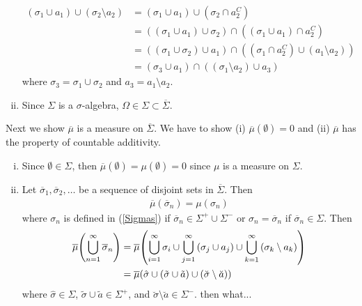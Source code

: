 \documentclass[12pt]{article}
\theoremstyle{plain}
\begin{document}
\begin{enumerate}[(i)]
        \begin{align*}
            (\sigma_1 \cup a_1) \cup (\sigma_2 \setminus a_2) &= (\sigma_1 \cup a_1) \cup (\sigma_2 \cap a_2^C) \\
            &= ((\sigma_1 \cup a_1) \cup \sigma_2) \cap ((\sigma_1 \cup a_1) \cap a_2^C) \\
            &= ((\sigma_1 \cup \sigma_2) \cup a_1) \cap ((\sigma_1 \cap a_2^C) \cup (a_1 \setminus a_2)) \\
            &= (\sigma_3 \cup a_1) \cap ((\sigma_1 \setminus a_2) \cup a_3)
        \end{align*}
        where $\sigma_3 = \sigma_1 \cup \sigma_2$ and $a_3 = a_1 \setminus a_2$.
    \item
        Since $\Sigma$ is a $\sigma$-algebra, $\Omega \in \Sigma \subset \overline{\Sigma}$.
\end{enumerate}
Next we show $\overline{\mu}$ is a measure on $\overline{\Sigma}$.  We have to show (i) $\overline{\mu}(\emptyset) = 0$ and (ii) $\overline{\mu}$ has the property of countable additivity.
\begin{enumerate}[(i)]
    \item
        Since $\emptyset \in \Sigma$, then $\overline{\mu}(\emptyset) = \mu(\emptyset) = 0$ since $\mu$ is a measure on $\Sigma$.
    \item
        Let $\overline{\sigma}_1, \overline{\sigma}_2, \dots$ be a sequence of disjoint sets in $\overline{\Sigma}$.  Then
        \begin{align*}
            \overline{\mu}(\overline{\sigma}_n) = \mu(\sigma_n)
        \end{align*}
        where $\sigma_n$ is defined in (\ref{Sigmas}) if $\overline{\sigma}_n \in \Sigma^+ \cup \Sigma^-$ or $\sigma_n = \overline{\sigma}_n$ if $\overline{\sigma}_n \in \Sigma$.  Then
        \begin{align*}
            \overline{\mu}\qty(\bigcup_{n=1}^\infty \overline{\sigma}_n) &= \overline{\mu}\qty(\bigcup_{i=1}^\infty \sigma_i \cup \bigcup_{j=1}^\infty \qty(\sigma_j \cup a_j) \cup \bigcup_{k=1}^\infty \qty(\sigma_k \setminus a_k)) \\
            &= \overline{\mu}\qty(\hat{\sigma} \cup (\tilde{\sigma} \cup \tilde{a}) \cup (\breve{\sigma} \setminus \breve{a}))
        \end{align*}
        where $\hat{\sigma} \in \Sigma$, $\tilde{\sigma} \cup \tilde{a} \in \Sigma^+$, and $\breve{\sigma} \setminus \breve{a} \in \Sigma^-$. {\color{red} then what...}
\end{enumerate}
\end{document}
